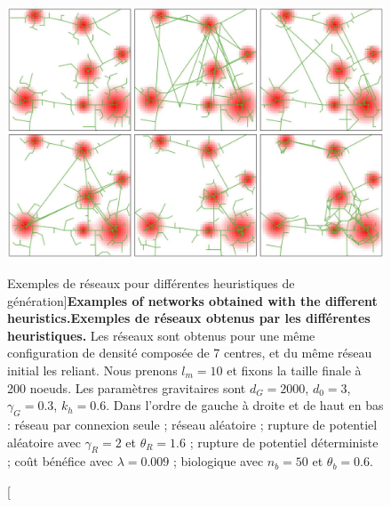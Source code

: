 \begin{figure}
	\includegraphics[width=\linewidth]{Figures/Final/7-1-2-fig-networkgrowth-examples.jpg}
\caption[Network examples][Exemples de réseaux pour différentes heuristiques de génération]{\textbf{Examples of networks obtained with the different heuristics.}\label{fig:networkgrowth:examples}}{\textbf{Exemples de réseaux obtenus par les différentes heuristiques.} Les réseaux sont obtenus pour une même configuration de densité composée de 7 centres, et du même réseau initial les reliant. Nous prenons $l_m = 10$ et fixons la taille finale à 200 noeuds. Les paramètres gravitaires sont $d_G = 2000$, $d_0 = 3$, $\gamma_G = 0.3$, $k_h = 0.6$. Dans l'ordre de gauche à droite et de haut en bas : réseau par connexion seule ; réseau aléatoire ; rupture de potentiel aléatoire avec $\gamma_R = 2$ et $\theta_R = 1.6$ ; rupture de potentiel déterministe ; coût bénéfice avec $\lambda = 0.009$ ; biologique avec $n_b = 50$ et $\theta_b = 0.6$.\label{fig:networkgrowth:examples}}
\end{figure}




